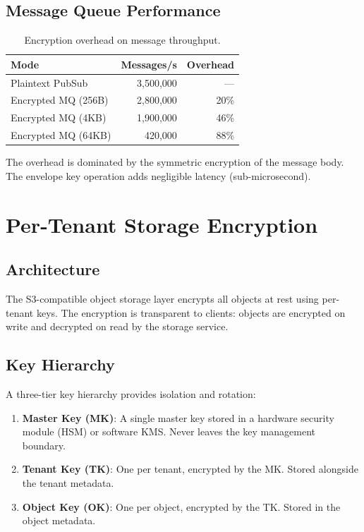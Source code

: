 \documentclass[11pt,a4paper]{article}
\begin{document}
\subsection{Message Queue Performance}

\begin{table}[h]
\centering
\caption{Encryption overhead on message throughput.}
\begin{tabular}{lrr}
\toprule
\textbf{Mode} & \textbf{Messages/s} & \textbf{Overhead} \\
\midrule
Plaintext PubSub   & 3{,}500{,}000 & --- \\
Encrypted MQ (256B) & 2{,}800{,}000 & 20\% \\
Encrypted MQ (4KB)  & 1{,}900{,}000 & 46\% \\
Encrypted MQ (64KB) &   420{,}000 & 88\% \\
\bottomrule
\end{tabular}
\end{table}

The overhead is dominated by the symmetric encryption of the message body. The envelope key operation adds negligible latency (sub-microsecond).

\section{Per-Tenant Storage Encryption}

\subsection{Architecture}

The S3-compatible object storage layer encrypts all objects at rest using per-tenant keys. The encryption is transparent to clients: objects are encrypted on write and decrypted on read by the storage service.

\subsection{Key Hierarchy}

A three-tier key hierarchy provides isolation and rotation:

\begin{enumerate}
    \item \textbf{Master Key (MK)}: A single master key stored in a hardware security module (HSM) or software KMS. Never leaves the key management boundary.
    \item \textbf{Tenant Key (TK)}: One per tenant, encrypted by the MK. Stored alongside the tenant metadata.
    \item \textbf{Object Key (OK)}: One per object, encrypted by the TK. Stored in the object metadata.
\end{enumerate}
\end{document}
